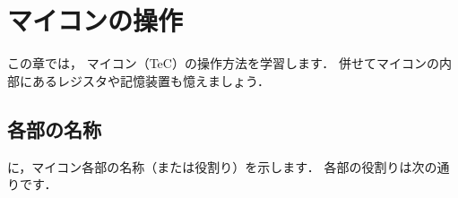 \renewcommand{\myincludegraphics}[2]{\texttt{[image: chap4/\#1]}}

\chapter{マイコンの操作\label{sousa}}

この章では，
マイコン（TeC）の操作方法を学習します．
併せてマイコンの内部にあるレジスタや記憶装置も憶えましょう．

\section{各部の名称}
に，マイコン各部の名称（または役割り）を示します．
各部の役割りは次の通りです．


